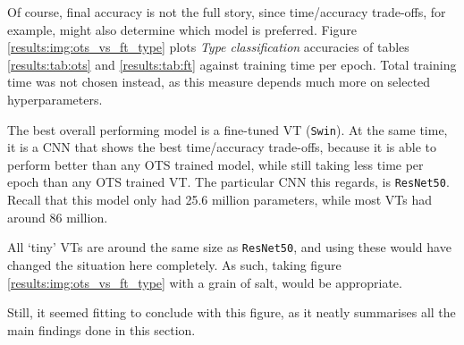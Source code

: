 Of course, final accuracy is not the full story, since time/accuracy trade-offs, for example, might also determine which model is preferred. Figure \ref{results:img:ots_vs_ft_type} plots \textit{Type classification} accuracies of tables \ref{results:tab:ots} and \ref{results:tab:ft} against training time per epoch. Total training time was not chosen instead, as this measure depends much more on selected hyperparameters.

The best overall performing model is a fine-tuned VT (\texttt{Swin}). At the same time, it is a CNN that shows the best time/accuracy trade-offs, because it is able to perform better than any OTS trained model, while still taking less time per epoch than any OTS trained VT. The particular CNN this regards, is \texttt{ResNet50}. Recall that this model only had 25.6 million parameters, while most VTs had around 86 million.

All `tiny' VTs are around the same size as \texttt{ResNet50}, and using these would have changed the situation here completely. As such, taking figure \ref{results:img:ots_vs_ft_type} with a grain of salt, would be appropriate.

Still, it seemed fitting to conclude with this figure, as it neatly summarises all the main findings done in this section.
